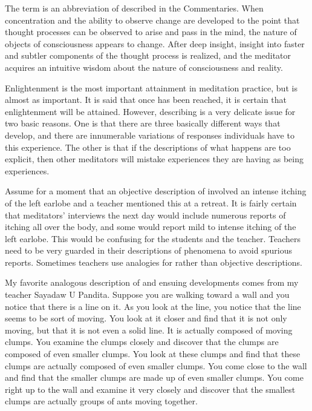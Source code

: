 \documentclass[a5paper,10pt,english]{book}
\begin{document}
\sphinxAtStartPar
The term  is an abbreviation of  described in the Commentaries. When
concentration and the ability to observe change are developed to the
point that thought processes can be observed to arise and pass in the
mind, the nature of objects of consciousness appears to change. After
deep insight, insight into faster and subtler components of the thought
process is realized, and the meditator acquires an intuitive wisdom
about the nature of consciousness and reality.

\sphinxAtStartPar
Enlightenment is the most important attainment in meditation practice,
but  is almost as important. It is said that once  has been reached, it is certain that enlightenment will be
attained. However, describing  is a very delicate issue
for two basic reasons. One is that there are three basically different
ways that  develop, and there are innumerable
variations of responses individuals have to this experience. The other
is that if the descriptions of what happens are too explicit, then other
meditators will mistake experiences they are having as being  experiences.

\sphinxAtStartPar
Assume for a moment that an objective description of 
involved an intense itching of the left earlobe and a teacher
mentioned this at a retreat. It is fairly certain that meditators’
interviews the next day would include numerous reports of itching all
over the body, and some would report mild to intense itching of the left
earlobe. This would be confusing for the students and the teacher.
Teachers need to be very guarded in their descriptions of phenomena to
avoid spurious reports. Sometimes teachers use analogies for  rather than objective descriptions.

\sphinxAtStartPar
My favorite analogous description of  and ensuing
developments comes from my teacher Sayadaw U Pandita. Suppose you are
walking toward a wall and you notice that there is a line on it. As you
look at the line, you notice that the line seems to be sort of moving.
You look at it closer and find that it is not only moving, but that it
is not even a solid line. It is actually composed of moving clumps. You
examine the clumps closely and discover that the clumps are composed of
even smaller clumps. You look at these clumps and find that these clumps
are actually composed of even smaller clumps. You come close to the wall
and find that the smaller clumps are made up of even smaller clumps. You
come right up to the wall and examine it very closely and discover that
the smallest clumps are actually groups of ants moving together.
\end{document}
